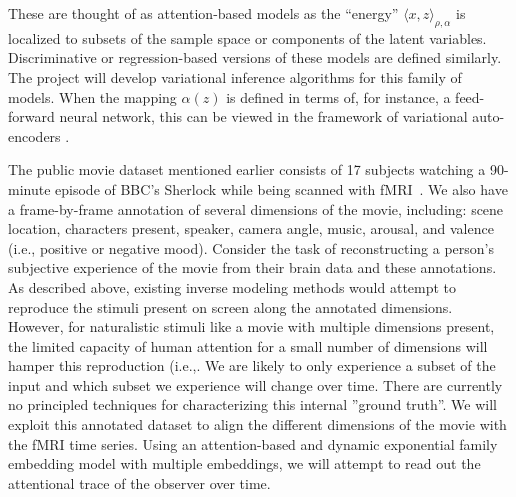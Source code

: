These are thought of as attention-based models as the ``energy''
$\langle x, z\rangle_{\rho,\alpha}$ is localized to subsets of the
sample space or components of the latent variables. Discriminative or regression-based versions of these
models are defined similarly. The project will develop variational
inference algorithms for this family of models. When the mapping 
$\alpha(z)$ is defined in terms of, for instance, a feed-forward
neural network, this can be viewed in the framework of variational auto-encoders
\citep{kingma13}.

The public movie dataset mentioned earlier consists of 17 subjects
watching a 90-minute episode of BBC's Sherlock while being scanned with
fMRI~\citep{chen17,baldassano17}. We also have a frame-by-frame
annotation of several dimensions of the movie, including: scene
location, characters present, speaker, camera angle, music, arousal, and
valence (i.e., positive or negative mood). Consider the task of
reconstructing a person's subjective experience of the movie from their
brain data and these annotations. As described above, existing inverse modeling
methods would attempt to reproduce the stimuli present on screen along the
annotated dimensions. However, for naturalistic stimuli like a movie with multiple
dimensions present, the limited capacity of human attention for a small
number of dimensions will hamper this reproduction (i.e.,. We are
likely to only experience a subset of the input and which subset we
experience will change over time. There are currently no principled
techniques for characterizing this internal ''ground truth''. We will
exploit this annotated dataset to align the different dimensions of the
movie with the fMRI time series. Using an attention-based and dynamic
exponential family embedding model with multiple embeddings, we will
attempt to read out the attentional trace of the observer over time.


